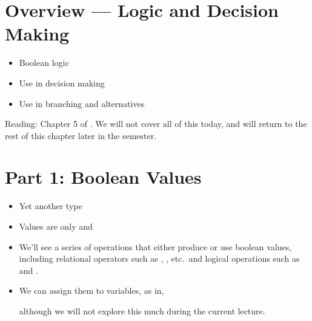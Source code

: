 \documentclass[letterpaper,10pt,english]{sphinxmanual}
\begin{document}
\section{Overview — Logic and Decision Making}
\label{\detokenize{lecture_notes/lec06_conditionals1:overview-logic-and-decision-making}}\begin{itemize}
\item {} 
Boolean logic

\item {} 
Use in decision making

\item {} 
Use in branching and alternatives

\end{itemize}

Reading: Chapter 5 of . We will not cover all
of this today, and will return
to the rest of this chapter later in the semester.


\section{Part 1: Boolean Values}
\label{\detokenize{lecture_notes/lec06_conditionals1:part-1-boolean-values}}\begin{itemize}
\item {} 
Yet another type

\item {} 
Values are only  and 

\item {} 
We’ll see a series of operations that either produce or use
boolean values, including relational operators such as \sphinxcode{\sphinxupquote{\textless{}}}, \sphinxcode{\sphinxupquote{\textless{}=}},
etc. and logical operations such as  and .

\item {} 
We can assign them to variables, as in,

%
\begin{sphinxVerbatim}[commandchars=\\\{\}]
  
\end{sphinxVerbatim}

although we will not explore this much during the current lecture.

\end{itemize}
\end{document}
